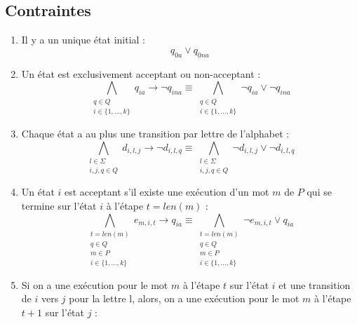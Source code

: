 \documentclass[a4paper, 12pt]{extarticle}
\begin{document}
\subsection{Contraintes} %
\label{sub:contraintes}

\begin{enumerate}
    \item Il y a un unique état initial :
    \begin{equation*}
        q_{0a} \vee q_{0na}
    \end{equation*}
    \item Un état est exclusivement acceptant ou non-acceptant :
    \begin{equation*}
        \bigwedge_{\substack{q\in Q \\ i\in \{1,\dots,k\}}} q_{ia} \rightarrow \neg q_{ina}\equiv
        \bigwedge_{\substack{q\in Q \\ i\in \{1,\dots,k\}}} \neg q_{ia} \vee \neg q_{ina}
    \end{equation*}
    \item Chaque état a au plus une transition par lettre de l'alphabet :
    \begin{equation*}
        \bigwedge_{\substack{l\in \Sigma\\i,j,q \in Q}} d_{i,l,j} \rightarrow \neg d_{i,l,q}\equiv
        \bigwedge_{\substack{l\in \Sigma\\i,j,q \in Q}}\neg d_{i,l,j} \vee \neg d_{i,l,q}
    \end{equation*}
    \item Un état $i$ est acceptant s'il existe une exécution d'un mot $m$ de $P$ qui se termine sur l'état $i$ à l'étape $t=len(m)$ :
    \begin{equation*}
        \bigwedge_{\substack{t=len(m)\\q \in Q\\ m \in P\\ i \in \{1,\dots,k\}}} e_{m,i,t} \rightarrow q_{ia} \equiv
        \bigwedge_{\substack{t=len(m)\\q \in Q\\ m \in P\\ i \in \{1,\dots,k\}}} \neg e_{m,i,t} \vee q_{ia}
    \end{equation*}
    \item Si on a une exécution pour le mot $m$ à l'étape $t$ sur l'état $i$ et une transition de $i$ vers $j$ pour la lettre l,
    alors, on a une exécution pour le mot $m$ à l'étape $t+1$ sur l'état $j$ :
    \begin{equation*}

\end{equation*}
\end{enumerate}
\end{document}
